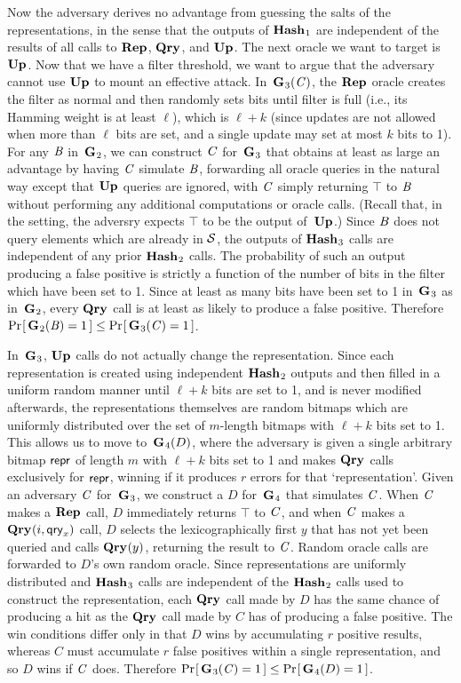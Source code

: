 Now the adversary derives no advantage from guessing the salts of the
representations, in the sense that the outputs of $\textup{\textbf{Hash}}\hspace{0.5pt}_1$ are independent of the results
of all calls to $\textup{\textbf{Rep}}\hspace{0.5pt}$, $\textup{\textbf{Qry}}\hspace{0.5pt}$, and $\textup{\textbf{Up}}\hspace{0.5pt}$. The next oracle we want to target
is $\textup{\textbf{Up}}\hspace{0.5pt}$. Now that we have a filter threshold, we want to argue that the
adversary cannot use $\textup{\textbf{Up}}\hspace{0.5pt}$ to mount an effective attack.
%
In~$\textup{\textbf{G}}\hspace{0.5pt}_3(\mathit{C})$, the $\textup{\textbf{Rep}}\hspace{0.5pt}$ oracle creates the filter as normal and then
randomly sets bits until filter is full (i.e., its Hamming weight is at least
$\ell$), which is $\ell+k$ (since
updates are not allowed when more than $\ell$ bits are set, and a single update
may set at most $k$ bits to 1). For any $\mathit{B}$ in~$\textup{\textbf{G}}\hspace{0.5pt}_2$, we can construct
$\mathit{C}$ for~$\textup{\textbf{G}}\hspace{0.5pt}_3$ that obtains at least as large an advantage by having $\mathit{C}$
simulate $\mathit{B}$, forwarding all oracle queries in the natural way except that
$\textup{\textbf{Up}}\hspace{0.5pt}$ queries are ignored, with $\mathit{C}$ simply returning $\top$ to $\mathit{B}$ without
performing any additional computations or oracle calls. (Recall that, in the
\erreps setting, the adversry expects $\top$ to be the output of~$\textup{\textbf{Up}}\hspace{0.5pt}$.) Since $\mathit{B}$ does not
query elements which are already in $\mathcal{S}$, the outputs of $\textup{\textbf{Hash}}\hspace{0.5pt}_3$ calls are
independent of any prior $\textup{\textbf{Hash}}\hspace{0.5pt}_2$ calls.
%
The probability of such an output producing a false positive is strictly a
function of the number of bits in the filter which have been set to 1.
%
Since at least as many bits have been set to 1 in~$\textup{\textbf{G}}\hspace{0.5pt}_3$ as in~$\textup{\textbf{G}}\hspace{0.5pt}_2$,
every $\textup{\textbf{Qry}}\hspace{0.5pt}$ call is at least as likely to produce a false positive. Therefore
$\Pr\hspace{-1pt}\left[\,\textup{\textbf{G}}\hspace{0.5pt}_2(\mathit{B}) = 1\,\right] \le \Pr\hspace{-1pt}\left[\,\textup{\textbf{G}}\hspace{0.5pt}_3(\mathit{C}) = 1\,\right]$.

In~$\textup{\textbf{G}}\hspace{0.5pt}_3$, $\textup{\textbf{Up}}\hspace{0.5pt}$ calls do not actually change the representation. Since each
representation is created using independent $\textup{\textbf{Hash}}\hspace{0.5pt}_2$ outputs and then filled
in a uniform random manner until $\ell+k$ bits are set to 1, and is never
modified afterwards, the representations
themselves are random bitmaps which are uniformly distributed over the set of
$m$-length bitmaps with $\ell+k$ bits set to 1. This allows us to move
to~$\textup{\textbf{G}}\hspace{0.5pt}_4(D)$, where the adversary is given a single arbitrary bitmap $\mathsf{repr}$
of length $m$ with $\ell+k$ bits set to 1 and makes $\textup{\textbf{Qry}}\hspace{0.5pt}$ calls exclusively
for $\mathsf{repr}$, winning if it produces $r$ errors for that `representation'. Given
an adversary $\mathit{C}$ for~$\textup{\textbf{G}}\hspace{0.5pt}_3$, we construct a $D$ for~$\textup{\textbf{G}}\hspace{0.5pt}_4$ that simulates
$\mathit{C}$. When $\mathit{C}$ makes a $\textup{\textbf{Rep}}\hspace{0.5pt}$ call, $D$ immediately returns $\top$ to $\mathit{C}$, and
when $\mathit{C}$ makes a $\textup{\textbf{Qry}}\hspace{0.5pt}(i,\mathsf{qry}_x)$ call, $D$ selects the lexicographically first
$y$ that has not yet been queried and calls $\textup{\textbf{Qry}}\hspace{0.5pt}(y)$, returning the result to
$\mathit{C}$. Random oracle calls are forwarded to $D$'s own random oracle.
Since representations are uniformly distributed and $\textup{\textbf{Hash}}\hspace{0.5pt}_3$ calls are
independent of the $\textup{\textbf{Hash}}\hspace{0.5pt}_2$ calls used to construct the representation, each
$\textup{\textbf{Qry}}\hspace{0.5pt}$ call made by $D$ has the same chance of producing a hit as the $\textup{\textbf{Qry}}\hspace{0.5pt}$
call made by $C$ has of producing a false positive.
%
The win conditions differ
only in that $D$ wins by accumulating $r$ positive results, whereas $C$ must
accumulate $r$ false positives within a single representation, and so $D$ wins
if $\mathit{C}$ does. Therefore $\Pr\hspace{-1pt}\left[\,\textup{\textbf{G}}\hspace{0.5pt}_3(\mathit{C}) = 1\,\right] \le \Pr\hspace{-1pt}\left[\,\textup{\textbf{G}}\hspace{0.5pt}_4(D) = 1\,\right]$.

